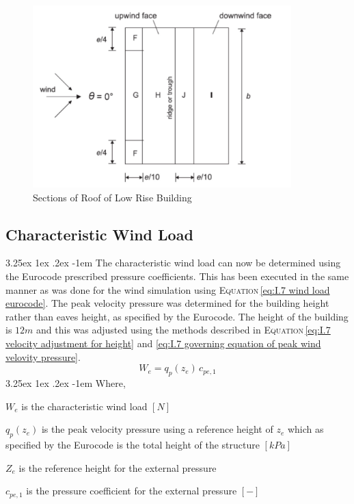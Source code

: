 \documentclass[11pt,a4paper,titlepage]{report}
\makeatletter
\renewcommand\paragraph{\@startsection{paragraph}{5}{\z@}%
  {3.25ex \@plus1ex \@minus.2ex}%
  {-1em}%
  {\normalfont\normalsize\bfseries}}
\makeatother
\begin{document}
\begin{figure}
    \centering
    \includegraphics[width=10cm]{roof_geometry.jpeg}
    \caption{Sections of Roof of Low Rise Building}
    \label{fig:roof geometry}
\end{figure}
\subsection{Characteristic Wind Load}
\paragraph{}The characteristic wind load can now be determined using the Eurocode prescribed pressure coefficients. This has been executed in the same manner as was done for the wind simulation using \textsc{Equation}\,\eqref{eq:I.7 wind load eurocode}. The peak velocity pressure was determined for the building height rather than eaves height, as specified by the Eurocode. The height of the building is $12m$ and this was adjusted using the methods described in \textsc{Equation}\,\eqref{eq:I.7 velocity adjustment for height} and \eqref{eq:I.7 governing equation of peak wind velovity pressure}.
\begin{equation}
    W_e=q_p(z_e)\,c_{pe,1}
    \label{eq:I.7 wind load eurocode}
\end{equation}
\paragraph{}Where,
\begin{itemize}
\begin{small}
    \item $W_e$ is the characteristic wind load $[N]$
    \item $q_p(z_e)$ is the peak velocity pressure using a reference height of $z_e$ which as specified by the Eurocode is the total height of the structure $[kPa]$
    \item $Z_e$ is the reference height for the external pressure 
    \item $c_{pe,1}$ is the pressure coefficient for the external pressure $[-]$
    \end{small}
\end{itemize}
\end{document}
